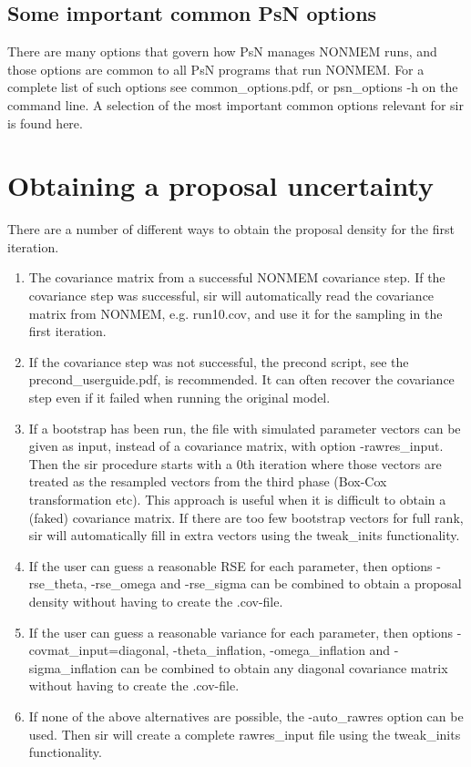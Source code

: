 \subsection{Some important common PsN options}
There are many options that govern how PsN manages NONMEM runs, and those options are common to all PsN programs that run NONMEM. For a complete list of such options see common\_options.pdf, or psn\_options -h on the command line. A selection of
the most important common options relevant for sir is found here. 

\section{Obtaining a proposal uncertainty}
There are a number of different ways to obtain the proposal density for the first iteration.
\begin{enumerate}
	\item The covariance matrix from a successful NONMEM covariance step. If the covariance step was successful, sir will automatically read the covariance matrix from NONMEM, e.g. run10.cov,  and use it for the sampling in the first iteration.
	\item If the covariance step was not successful, the precond script, see the precond\_userguide.pdf, is recommended. It can often recover the covariance step even if it failed when running the original model.
	\item If a bootstrap has been run, the file with simulated parameter vectors can be given as input, instead of a covariance matrix, with option -rawres\_input. Then the sir procedure starts with a 0th iteration where those vectors are treated as the resampled vectors from the third phase (Box-Cox transformation etc). This approach is useful when it is difficult to obtain a (faked) covariance matrix. If there are too few bootstrap vectors for full rank, sir will automatically fill in extra vectors using the tweak\_inits functionality.
	\item If the user can guess a reasonable RSE for each parameter, then options -rse\_theta, -rse\_omega and -rse\_sigma can be combined to obtain a proposal density without having to create the .cov-file. 
	\item If the user can guess a reasonable variance for each parameter, then options -covmat\_input=diagonal, -theta\_inflation, -omega\_inflation and -sigma\_inflation can be combined to obtain any diagonal covariance matrix
	without having to create the .cov-file.
	\item If none of the above alternatives are possible, the -auto\_rawres option can be used.	Then sir will create a complete rawres\_input file using the tweak\_inits functionality.
\end{enumerate}
